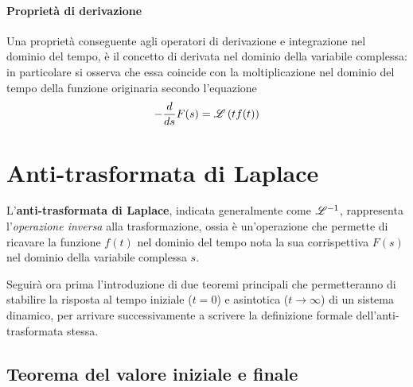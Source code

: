 		\paragraph{Proprietà di derivazione} Una proprietà conseguente agli operatori di derivazione e integrazione nel dominio del tempo, è il concetto di derivata nel dominio della variabile complessa: in particolare si osserva che essa coincide con la moltiplicazione nel dominio del tempo della funzione originaria secondo l'equazione
		\begin{equation} \label{eq:trasf:propderivazione}
			- \frac d {ds}F(s) = \mathscr L \left( t f(t) \right)
		\end{equation}
		
		
\section{Anti-trasformata di Laplace}
	L'\textbf{anti-trasformata di Laplace}, indicata generalmente come $\mathscr {L}^{-1}$, rappresenta l'\textit{operazione inversa} alla trasformazione, ossia è un'operazione che permette di ricavare la funzione $f(t)$ nel dominio del tempo nota la sua corrispettiva $F(s)$ nel dominio della variabile complessa $s$.
	
	Seguirà ora prima l'introduzione di due teoremi principali che permetteranno di stabilire la risposta al tempo iniziale ($t=0$) e asintotica ($t\rightarrow \infty$) di un sistema dinamico, per arrivare successivamente a scrivere la definizione formale dell'anti-trasformata stessa.
	
	\subsection{Teorema del valore iniziale e finale}
		
